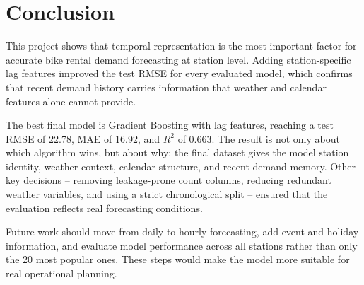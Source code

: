 \section{Conclusion}

This project shows that temporal representation is the most important 
factor for accurate bike rental demand forecasting at station level. 
Adding station-specific lag features improved the test RMSE for every 
evaluated model, which confirms that recent demand history carries 
information that weather and calendar features alone cannot provide.

The best final model is Gradient Boosting with lag features, reaching 
a test RMSE of 22.78, MAE of 16.92, and $R^2$ of 0.663. The result is 
not only about which algorithm wins, but about why: the final dataset 
gives the model station identity, weather context, calendar structure, 
and recent demand memory. Other key decisions -- removing leakage-prone 
count columns, reducing redundant weather variables, and using a strict 
chronological split -- ensured that the evaluation reflects real 
forecasting conditions.

Future work should move from daily to hourly forecasting, add event 
and holiday information, and evaluate model performance across all 
stations rather than only the 20 most popular ones. These steps would 
make the model more suitable for real operational planning.